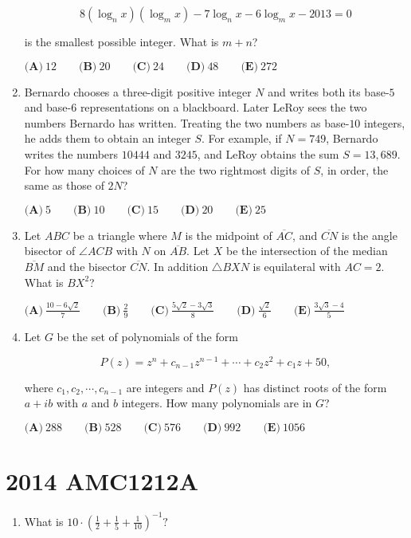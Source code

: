 \documentclass{article}
\begin{document}
\begin{enumerate}[label=\arabic*., itemsep=0.5em]
\begin{equation*}
8(\log_n x)(\log_m x)-7\log_n x-6 \log_m x-2013 = 0
\end{equation*}

is the smallest possible integer. What is \(m+n\)?

\( \textbf{(A)}\ 12\qquad\textbf{(B)}\ 20\qquad\textbf{(C)}\ 24\qquad\textbf{(D)}\ 48\qquad\textbf{(E)}\ 272 \)\par \vspace{0.5em}\item Bernardo chooses a three-digit positive integer \(N\) and writes both its base-\(5\) and base-\(6\) representations on a blackboard. Later LeRoy sees the two numbers Bernardo has written. Treating the two numbers as base-\(10\) integers, he adds them to obtain an integer \(S\). For example, if \(N=749\), Bernardo writes the numbers \(10444\) and \(3245\), and LeRoy obtains the sum \(S=13,689\). For how many choices of \(N\) are the two rightmost digits of \(S\), in order, the same as those of \(2N\)?

\( \textbf{(A)}\ 5\qquad\textbf{(B)}\ 10\qquad\textbf{(C)}\ 15\qquad\textbf{(D)}\ 20\qquad\textbf{(E)}\ 25 \)\par \vspace{0.5em}\item Let \(ABC\) be a triangle where \(M\) is the midpoint of \(\overline{AC}\), and \(\overline{CN}\) is the angle bisector of \(\angle{ACB}\) with \(N\) on \(\overline{AB}\). Let \(X\) be the intersection of the median \(\overline{BM}\) and the bisector \(\overline{CN}\). In addition \(\triangle BXN\) is equilateral with \(AC=2\). What is \(BX^2\)?

\(\textbf{(A)}\  \frac{10-6\sqrt{2}}{7} \qquad \textbf{(B)}\ \frac{2}{9} \qquad \textbf{(C)}\ \frac{5\sqrt{2}-3\sqrt{3}}{8} \qquad \textbf{(D)}\ \frac{\sqrt{2}}{6} \qquad \textbf{(E)}\ \frac{3\sqrt{3}-4}{5}\)\par \vspace{0.5em}\item Let \(G\) be the set of polynomials of the form

\begin{equation*}
P(z)=z^n+c_{n-1}z^{n-1}+\cdots+c_2z^2+c_1z+50,
\end{equation*}

where \( c_1,c_2,\cdots, c_{n-1} \) are integers and \(P(z)\) has distinct roots of the form \(a+ib\) with \(a\) and \(b\) integers. How many polynomials are in \(G\)?

\( \textbf{(A)}\ 288\qquad\textbf{(B)}\ 528\qquad\textbf{(C)}\ 576\qquad\textbf{(D)}\ 992\qquad\textbf{(E)}\ 1056 \)\par \vspace{0.5em}\end{enumerate}\newpage\section*{2014 AMC1212A}\begin{enumerate}[label=\arabic*., itemsep=0.5em]\item What is \(10 \cdot \left(\tfrac{1}{2} + \tfrac{1}{5} + \tfrac{1}{10}\right)^{-1}?\)


\end{enumerate}
\end{document}
